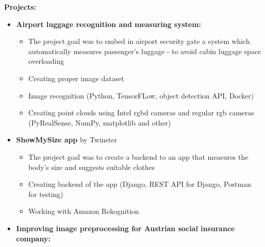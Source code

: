 \documentclass[10pt,a4paper,ragged2e,withhyper, normalphoto]{altacv}
\begin{document}
\begin{paracol}{2}
    \textbf{Projects:}
    \begin{itemize}
        \item \textbf{\textcolor{DarkPastelRed}{Airport luggage recognition and measuring system:}}
        \begin{itemize}
            \item The project goal was to embed in airport security gate a system which automatically measures passenger's luggage - to avoid cabin luggage space overloading
            \item Creating proper image dataset
            \item Image recognition (Python, TensorFLow, object detection API, Docker)
            \item Creating point clouds using Intel rgbd cameras and regular rgb cameras (PyRealSense, NumPy, matplotlib and other)
        \end{itemize}
        \item \textcolor{DarkPastelRed}{\textbf{ShowMySize app} by Twinster}
        \begin{itemize}
            \item The project goal was to create a backend to an app that measures the body's size and suggests suitable clothes
            \item Creating backend of the app (Django, REST API for Django, Postman for testing)
            \item Working with Amazon Rekognition
        \end{itemize}
        \item \textbf{\textcolor{DarkPastelRed}{Improving image preprocessing for Austrian social insurance company:}}

\end{itemize}
\end{paracol}
\end{document}
